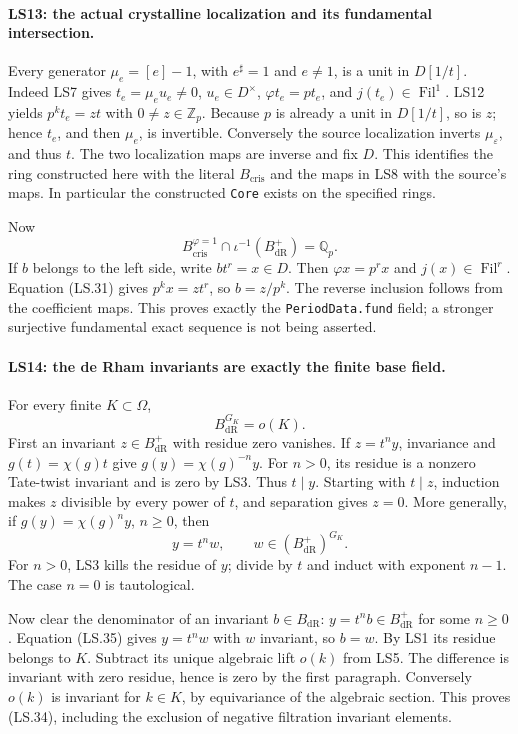 \paragraph{LS13: the actual crystalline localization and its fundamental intersection.}
Every generator $\mu_e=[e]-1$, with $e^\sharp=1$ and $e\ne1$,
is a unit in $D[1/t]$. Indeed LS7 gives
$t_e=\mu_eu_e\ne0$, $u_e\in D^\times$,
$\varphi t_e=pt_e$, and $j(t_e)\in\operatorname{Fil}^1$.
LS12 yields $p^kt_e=z t$ with $0\ne z\in\mathbb Z_p$.
Because $p$ is already a unit in $D[1/t]$, so is $z$; hence
$t_e$, and then $\mu_e$, is invertible. Conversely the source
localization inverts $\mu_\varepsilon$, and thus $t$.
The two localization maps are inverse and fix $D$. This identifies
the ring constructed here with the literal $B_{\mathrm{cris}}$
and the maps in LS8 with the source's maps. In particular the
constructed \texttt{Core} exists on the specified rings.

Now
\[
 B_{\mathrm{cris}}^{\varphi=1}\cap
        \iota^{-1}(B_{\mathrm{dR}}^+)=\mathbb Q_p.    \tag{LS.33}
\]
If $b$ belongs to the left side, write $bt^r=x\in D$.
Then $\varphi x=p^r x$ and $j(x)\in\operatorname{Fil}^r$.
Equation (LS.31) gives $p^kx=z t^r$, so $b=z/p^k$.
The reverse inclusion follows from the coefficient maps.
This proves exactly the \texttt{PeriodData.fund} field; a stronger
surjective fundamental exact sequence is not being asserted.

\paragraph{LS14: the de Rham invariants are exactly the finite base field.}
For every finite $K\subset\Omega$,
\[
                        B_{\mathrm{dR}}^{G_K}=o(K).       \tag{LS.34}
\]
First an invariant $z\in B_{\mathrm{dR}}^+$ with residue zero
vanishes. If $z=t^n y$, invariance and $g(t)=\chi(g)t$
give $g(y)=\chi(g)^{-n}y$. For $n>0$, its residue is a
nonzero Tate-twist invariant and is zero by LS3. Thus $t\mid y$.
Starting with $t\mid z$, induction makes $z$ divisible by every
power of $t$, and separation gives $z=0$.
More generally, if $g(y)=\chi(g)^n y$, $n\ge0$, then
\[
                y=t^n w,\qquad w\in(B_{\mathrm{dR}}^+)^{G_K}.
                                                               \tag{LS.35}
\]
For $n>0$, LS3 kills the residue of $y$; divide by $t$ and
induct with exponent $n-1$. The case $n=0$ is tautological.

Now clear the denominator of an invariant $b\in B_{\mathrm{dR}}$:
$y=t^n b\in B_{\mathrm{dR}}^+$ for some $n\ge0$.
Equation (LS.35) gives $y=t^n w$ with $w$ invariant, so $b=w$.
By LS1 its residue belongs to $K$. Subtract its unique algebraic
lift $o(k)$ from LS5. The difference is invariant with zero
residue, hence is zero by the first paragraph. Conversely $o(k)$
is invariant for $k\in K$, by equivariance of the algebraic
section. This proves (LS.34), including the exclusion of negative
filtration invariant elements.

